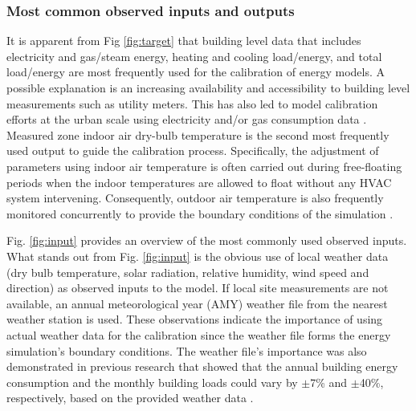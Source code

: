\documentclass[review]{elsarticle}
\begin{document}
\subsubsection{Most common observed inputs and outputs}

It is apparent from Fig \ref{fig:target} that building level data that includes electricity and gas/steam energy, heating and cooling load/energy, and total load/energy are most frequently used for the calibration of energy models. A possible explanation is an increasing availability and accessibility to building level measurements such as utility meters. This has also led to model calibration efforts at the urban scale using electricity and/or gas consumption data \cite{santos2018evaluating, sokol2017validation, nagpal2019framework, chen2020automatic, krayem2019urban}. Measured zone indoor air dry-bulb temperature is the second most frequently used output to guide the calibration process. Specifically, the adjustment of parameters using indoor air temperature is often carried out during free-floating periods when the indoor temperatures are allowed to float without any HVAC system intervening. Consequently, outdoor air temperature is also frequently monitored concurrently to provide the boundary conditions of the simulation \cite{martinez2019energy, figueiredo2018comparison, lee2018improvements, andrade-cabrera2017ensemble, mylona2017frozen, elharidi2017energy, tokarik2016life, ramosruiz2016genetic, roberti2015calibrating, cipriano2015evaluation, derosa2019iterative, zuhaib2019application, lundstrom2019bayesian, aparicio-fernandez2019energy, cornaro2017energy, ferrara2020optimizing}.

Fig. \ref{fig:input} provides an overview of the most commonly used observed inputs. What stands out from Fig. \ref{fig:input} is the obvious use of local weather data (dry bulb temperature, solar radiation, relative humidity, wind speed and direction) as observed inputs to the model. If local site measurements are not available, an annual meteorological year (AMY) weather file from the nearest weather station is used. These observations indicate the importance of using actual weather data for the calibration since the weather file forms the energy simulation's boundary conditions. The weather file's importance was also demonstrated in previous research that showed that the annual building energy consumption and the monthly building loads could vary by $\pm$7\% and $\pm$40\%, respectively, based on the provided weather data \cite{bhandari2012evaluation}.
\end{document}
